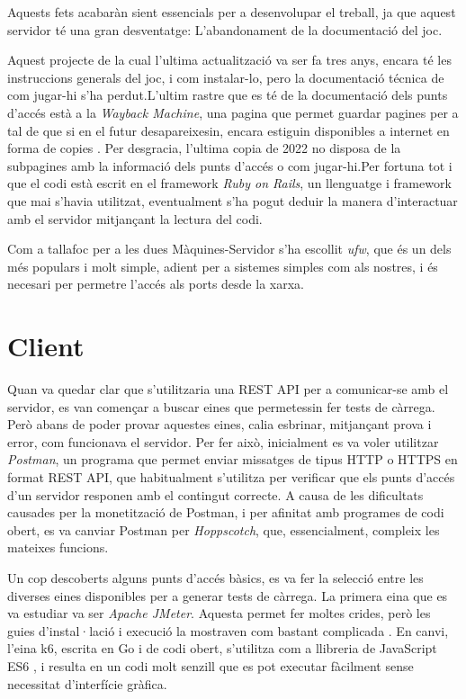 Aquests fets acabaràn sient essencials per a desenvolupar el treball, ja que aquest servidor té una gran desventatge: L'abandonament de la documentació del joc.

Aquest projecte de la cual l'ultima actualització va ser fa tres anys, encara té les instruccions generals del joc, i com instalar-lo\cite{noauthor_make-apis-fungamesclue-apireadmemd_nodate}, pero la documentació técnica de com jugar-hi s'ha perdut.L'ultim rastre que es té de la documentació dels punts d'accés està a la \textit{Wayback Machine}, una pagina que permet guardar pagines per a tal de que si en el futur desapareixesin, encara estiguin disponibles a internet en forma de copies \cite{noauthor_make_2022}. Per desgracia, l'ultima copia de 2022 no disposa de la subpagines amb la informació dels punts d'accés o com jugar-hi.Per fortuna tot i que el codi està escrit en el framework \textit{Ruby on Rails}, un llenguatge i framework que mai s'havia utilitzat, eventualment s'ha pogut deduir la manera d'interactuar amb el servidor mitjançant la lectura del codi.

Com a tallafoc per a les dues Màquines-Servidor s'ha escollit \textit{ufw}, que és un dels més populars i molt simple, adient per a sistemes simples com als nostres, i és necesari per permetre l'accés als ports desde la xarxa.\cite{noauthor_uncomplicated_nodate}

\section{Client}

Quan va quedar clar que s'utilitzaria una REST API per a comunicar-se amb el servidor, es van començar a buscar eines que permetessin fer tests de càrrega. Però abans de poder provar aquestes eines, calia esbrinar, mitjançant prova i error, com funcionava el servidor. Per fer això, inicialment es va voler utilitzar \textit{Postman}, un programa que permet enviar missatges de tipus HTTP o HTTPS en format REST API, que habitualment s'utilitza per verificar que els punts d'accés d'un servidor responen amb el contingut correcte. A causa de les dificultats causades per la monetització de Postman, i per afinitat amb programes de codi obert, es va canviar Postman per \textit{Hoppscotch}, que, essencialment, compleix les mateixes funcions.\cite{noauthor_hoppscotch_nodate}

Un cop descoberts alguns punts d'accés bàsics, es va fer la selecció entre les diverses eines disponibles per a generar tests de càrrega. La primera eina que es va estudiar va ser \textit{Apache JMeter}. Aquesta permet fer moltes crides, però les guies d'instal·lació i execució la mostraven com bastant complicada \cite{noauthor_how_nodate}. En canvi, l'eina k6, escrita en Go i de codi obert, s'utilitza com a llibreria de JavaScript ES6 \cite{simpson_you_2015}, i resulta en un codi molt senzill que es pot executar fàcilment sense necessitat d'interfície gràfica.\cite{noauthor_running_nodate}